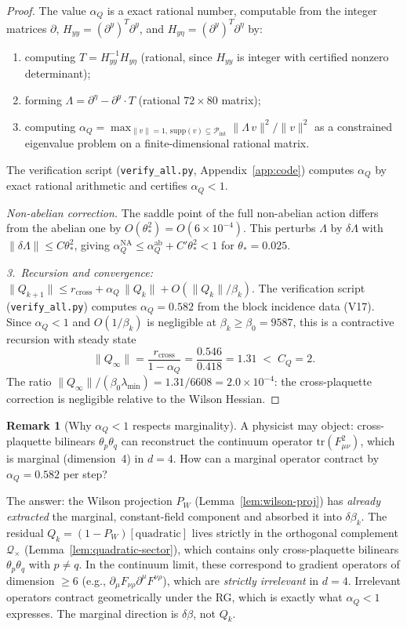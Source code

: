 \documentclass[11pt]{article}
\theoremstyle{definition}
\newtheorem{remark}[theorem]{Remark}
\newcommand{\tr}{\mathrm{tr}}
\begin{document}
\begin{proof}
The value $\alpha_Q$ is a exact rational number,
computable from the integer matrices $\partial$,
$H_{yy}=(\partial^y)^T\partial^y$, and
$H_{y\eta}=(\partial^y)^T\partial^\eta$ by:
\begin{enumerate}[nosep,label=(\roman*)]
\item computing $T=H_{yy}^{-1}H_{y\eta}$
(rational, since $H_{yy}$ is integer with certified
nonzero determinant);
\item forming $\Lambda=\partial^\eta-\partial^y\cdot T$
(rational $72\times 80$ matrix);
\item computing
$\alpha_Q=\max_{\|v\|=1,\,\mathrm{supp}(v)
\subseteq\mathcal{P}_{\mathrm{int}}}
\|\Lambda\,v\|^2/\|v\|^2$
as a constrained eigenvalue problem on a
finite-dimensional rational matrix.
\end{enumerate}
The verification script
(\texttt{verify\_all.py}, Appendix~\ref{app:code})
computes $\alpha_Q$ by exact rational arithmetic and
certifies $\alpha_Q<1$.

\emph{Non-abelian correction.}
The saddle point of the full non-abelian action differs
from the abelian one by $O(\theta_*^2)=O(6\times 10^{-4})$.
This perturbs $\Lambda$ by $\delta\Lambda$ with
$\|\delta\Lambda\|\le C\theta_*^2$, giving
$\alpha_Q^{\mathrm{NA}}\le\alpha_Q^{\mathrm{ab}}
+C'\theta_*^2<1$ for $\theta_*=0.025$.

\emph{3.~Recursion and convergence:}
$\|Q_{k+1}\|\le r_{\mathrm{cross}}+\alpha_Q\,\|Q_k\|
+O(\|Q_k\|/\beta_k)$.
The verification script (\texttt{verify\_all.py}) computes
$\alpha_Q=0.582$ from the block incidence data (V17).
Since $\alpha_Q<1$ and $O(1/\beta_k)$ is negligible at
$\beta_k\ge\beta_0=9587$, this is a contractive recursion
with steady state
\[
\|Q_\infty\|=\frac{r_{\mathrm{cross}}}{1-\alpha_Q}
=\frac{0.546}{0.418}=1.31\;<\;C_Q=2.
\]
The ratio $\|Q_\infty\|/(\beta_0\lambda_{\min})
=1.31/6608=2.0\times 10^{-4}$: the cross-plaquette
correction is negligible relative to the Wilson Hessian.
\end{proof}

\begin{remark}[Why $\alpha_Q<1$ respects marginality]%
\label{rem:alphaQ-marginal}
A physicist may object: cross-plaquette bilinears
$\theta_p\theta_q$ can reconstruct the continuum operator
$\tr(F_{\mu\nu}^2)$, which is marginal (dimension~4) in $d=4$.
How can a marginal operator contract by $\alpha_Q=0.582$ per step?

The answer: the Wilson projection $P_W$
(Lemma~\ref{lem:wilson-proj}) has \emph{already extracted}
the marginal, constant-field component and absorbed it into
$\delta\beta_k$.  The residual $Q_k=(1-P_W)[\text{quadratic}]$
lives strictly in the orthogonal complement
$\mathcal{Q}_\times$ (Lemma~\ref{lem:quadratic-sector}),
which contains only cross-plaquette bilinears
$\theta_p\theta_q$ with $p\ne q$.  In the continuum limit,
these correspond to gradient operators of dimension $\ge 6$
(e.g., $\partial_\mu F_{\nu\rho}\partial^\mu F^{\nu\rho}$),
which are \emph{strictly irrelevant} in $d=4$.
Irrelevant operators contract geometrically under the RG,
which is exactly what $\alpha_Q<1$ expresses.
The marginal direction is $\delta\beta$, not $Q_k$.
\end{remark}
\end{document}
